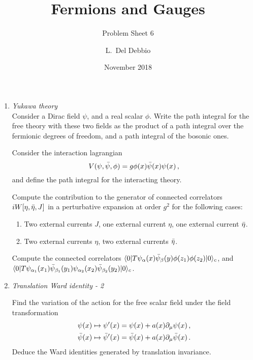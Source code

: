 \documentclass{tutorial}
\subtitle{Problem Sheet 6}
\title{Fermions and Gauges}
\author{L.~Del Debbio}
\date{November 2018}
\begin{document}
\maketitle

\begin{enumerate}
  \item \emph{ Yukawa theory} \\
    
    Consider a Dirac field $\psi$, and a real scalar $\phi$. Write the
    path integral for the free theory with these two fields as the
    product of a path integral over the fermionic degrees of freedom,
    and a path integral of the bosonic ones. 

    Consider the interaction lagrangian
    \[
    V(\psi,\bar{\psi},\phi) = g \phi(x) \bar{\psi}(x) \psi(x)\, ,
    \]
    and define the path integral for the interacting theory. 

    Compute the contribution to the generator of connected correlators
    $iW[\eta,\bar{\eta}, J]$ in a perturbative expansion at order $g^2$
    for the following cases:
    \begin{enumerate}
    \item Two external currents $J$, one external current $\eta$, one
      external current $\bar{\eta}$.
    \item Two external currents $\eta$, two
      external currents $\bar{\eta}$.
    \end{enumerate}
    
    Compute the connected correlators
    $\langle 0 | T \psi_\alpha(x) \bar{\psi}_\beta(y) \phi(z_1)
    \phi(z_2)| 0 \rangle_c$,
    and \\
    $\langle 0 | T \psi_{\alpha_1}(x_1) \bar{\psi}_{\beta_1}(y_1)
    \psi_{\alpha_2}(x_2) \bar{\psi}_{\beta_2}(y_2) |0\rangle_c$.

    \bigskip

  \item \emph{ Translation Ward identity - 2}
    
    Find the variation of the action for the free scalar field under
    the field transformation
    \begin{align*}
    \psi(x) &\mapsto \psi'(x) = \psi(x) + a(x) \partial_\mu \psi(x)\,
              , \\
    \bar{\psi}(x) &\mapsto \bar{\psi}'(x) = \bar{\psi}(x) + a(x) \partial_\mu \bar{\psi}(x)\,
              .
    \end{align*}
    Deduce the Ward identities generated by translation invariance. 


\end{enumerate}
\end{document}
